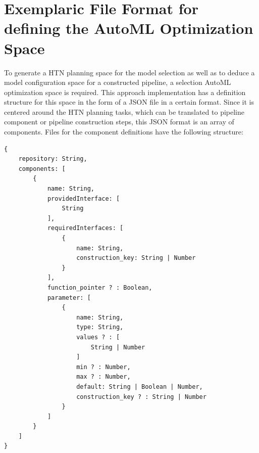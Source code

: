 \section{Exemplaric File Format for defining the AutoML Optimization Space}
\label{sec:implementation:json}
To generate a HTN planning space for the model selection as well as to deduce a model configuration space for a constructed pipeline, a selection AutoML optimization space is required.
This approach implementation has a definition structure for this space in the form of a JSON file in a certain format.\newline
Since it is centered around the HTN planning tasks, which can be translated to pipeline component or pipeline construction steps, this JSON format is an array of components.
Files for the component definitions have the following structure:
\begin{verbatim}
{
    repository: String,
    components: [
        {
            name: String,
            providedInterface: [
                String
            ],
            requiredInterfaces: [
                {
                    name: String,
                    construction_key: String | Number
                }
            ],
            function_pointer ? : Boolean,
            parameter: [
                {
                    name: String,
                    type: String,
                    values ? : [
                        String | Number
                    ]
                    min ? : Number,
                    max ? : Number,
                    default: String | Boolean | Number,
                    construction_key ? : String | Number
                }
            ]
        }
    ]
}
\end{verbatim}

